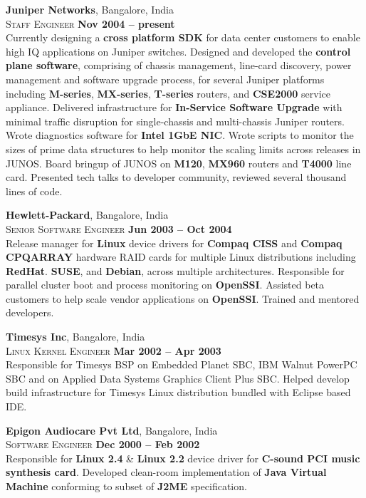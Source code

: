 \documentclass[margin,line]{resume}
\begin{document}
\begin{resume}
    \textbf{Juniper Networks}, Bangalore, India \\\vspace{1mm}%
    \textsc{Staff Engineer} \hfill \textbf{Nov 2004 -- present}\\
    Currently designing a {\bf cross platform SDK} for data center
    customers to enable high IQ applications on Juniper switches.
    Designed and developed the {\bf control plane software},
    comprising of chassis management, line-card discovery, power
    management and software upgrade process, for several Juniper
    platforms including {\bf M-series}, {\bf MX-series},
    {\bf T-series} routers, and {\bf CSE2000} service appliance.
    Delivered infrastructure for {\bf In-Service Software Upgrade}
    with minimal traffic disruption for single-chassis and
    multi-chassis Juniper routers. Wrote diagnostics software for
    {\bf Intel 1GbE NIC}. Wrote scripts to monitor the sizes of prime
    data structures to help monitor the scaling limits across releases
    in JUNOS. Board bringup of JUNOS on {\bf M120}, {\bf MX960}
    routers and {\bf T4000} line card. Presented tech talks to
    developer community, reviewed several thousand lines of code.

    \textbf{Hewlett-Packard}, Bangalore, India \\\vspace{1mm}%
    \textsc{Senior Software Engineer} \hfill \textbf{Jun 2003 -- Oct 2004}\\
    Release manager for {\bf Linux} device drivers for
    {\bf Compaq CISS} and {\bf Compaq CPQARRAY} hardware RAID cards
    for multiple Linux distributions including {\bf RedHat}.
    {\bf SUSE}, and {\bf Debian}, across multiple architectures.
    Responsible for parallel cluster boot and process monitoring on
    {\bf OpenSSI}. Assisted beta customers to help scale vendor
    applications on {\bf OpenSSI}. Trained and mentored developers.

    \textbf{Timesys Inc}, Bangalore, India \\\vspace{1mm}%
    \textsc{Linux Kernel Engineer} \hfill \textbf{Mar 2002 -- Apr 2003}\\
    Responsible for Timesys BSP on Embedded Planet SBC, IBM Walnut
    PowerPC SBC and on Applied Data Systems Graphics Client Plus SBC.
    Helped develop build infrastructure for Timesys Linux distribution
    bundled with Eclipse based IDE.

    \textbf{Epigon Audiocare Pvt Ltd}, Bangalore, India \\\vspace{1mm}%
    \textsc{Software Engineer} \hfill \textbf{Dec 2000 -- Feb 2002}\\
    Responsible for {\bf Linux 2.4} \& {\bf Linux 2.2} device driver
    for {\bf C-sound PCI music synthesis card}. Developed clean-room
    implementation of {\bf Java Virtual Machine} conforming to subset
    of {\bf J2ME} specification.
    


\end{resume}
\end{document}
